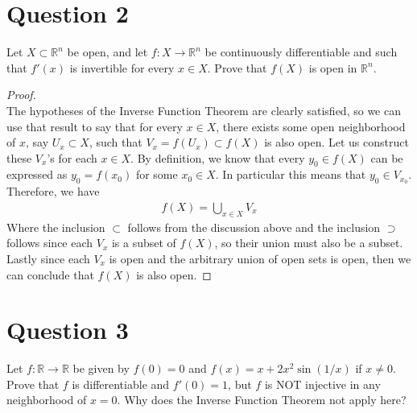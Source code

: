 \documentclass[10pt,a4paper]{article}
\theoremstyle{definition}
\theoremstyle{definition}
\numberwithin{equation}{section}
\begin{document}
\section*{Question 2}
Let $X \subset \mathbb{R}^n$ be open, and let $f: X \to \mathbb{R}^n$ be continuously differentiable and such that $f'(x)$ is invertible for every $x \in X$. Prove that $f(X)$ is open in $\mathbb{R}^n$.

\begin{proof}$ $
\\The hypotheses of the Inverse Function Theorem are clearly satisfied, so we can use that result to say that for every $x \in X$, there exists some open neighborhood of $x$, say $U_x \subset X$, such that $V_x = f(U_x) \subset f(X)$ is also open. Let us construct these $V_x$'s for each $x \in X$. By definition, we know that every $y_0 \in f(X)$ can be expressed as $y_0 = f(x_0)$ for some $x_0 \in X$. In particular this means that $y_0 \in V_{x_0}$. Therefore, we have 
\begin{align*}
f(X) = \bigcup_{x \in X} V_x
\end{align*}
Where the inclusion $\subset$ follows from the discussion above and the inclusion $\supset$ follows since each $V_x$ is a subset of $f(X)$, so their union must also be a subset. Lastly since each $V_x$ is open and the arbitrary union of open sets is open, then we can conclude that $f(X)$ is also open. 
\end{proof}

\section*{Question 3}
Let $f: \mathbb{R} \to \mathbb{R}$ be given by $f(0) = 0$ and $f(x) = x + 2x^2 \sin(1/x)$ if $x \neq 0$. Prove that $f$ is differentiable and $f'(0) = 1$, but $f$ is NOT injective in any neighborhood of $x = 0$. Why does the Inverse Function Theorem not apply here?
\end{document}

